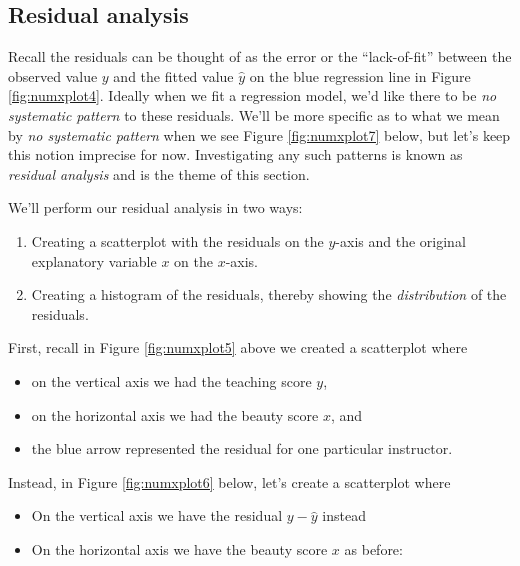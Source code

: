 \documentclass[12pt, krantz2,]{krantz}
\providecommand{\tightlist}{%
  \setlength{\itemsep}{0pt}\setlength{\parskip}{0pt}}
\begin{document}
\hypertarget{model1residuals}{%
\subsection{Residual analysis}\label{model1residuals}}

Recall the residuals can be thought of as the error or the ``lack-of-fit'' between the observed value \(y\) and the fitted value \(\widehat{y}\) on the blue regression line in Figure \ref{fig:numxplot4}. Ideally when we fit a regression model, we'd like there to be \emph{no systematic pattern} to these residuals. We'll be more specific as to what we mean by \emph{no systematic pattern} when we see Figure \ref{fig:numxplot7} below, but let's keep this notion imprecise for now. Investigating any such patterns is known as \emph{residual analysis} and is the theme of this section.

We'll perform our residual analysis in two ways:

\begin{enumerate}
\def\labelenumi{\arabic{enumi}.}
\tightlist
\item
  Creating a scatterplot with the residuals on the \(y\)-axis and the original explanatory variable \(x\) on the \(x\)-axis.
\item
  Creating a histogram of the residuals, thereby showing the \emph{distribution} of the residuals.
\end{enumerate}

First, recall in Figure \ref{fig:numxplot5} above we created a scatterplot where

\begin{itemize}
\tightlist
\item
  on the vertical axis we had the teaching score \(y\),
\item
  on the horizontal axis we had the beauty score \(x\), and
\item
  the blue arrow represented the residual for one particular instructor.
\end{itemize}

Instead, in Figure \ref{fig:numxplot6} below, let's create a scatterplot where

\begin{itemize}
\tightlist
\item
  On the vertical axis we have the residual \(y-\widehat{y}\) instead
\item
  On the horizontal axis we have the beauty score \(x\) as before:
\end{itemize}
\end{document}
